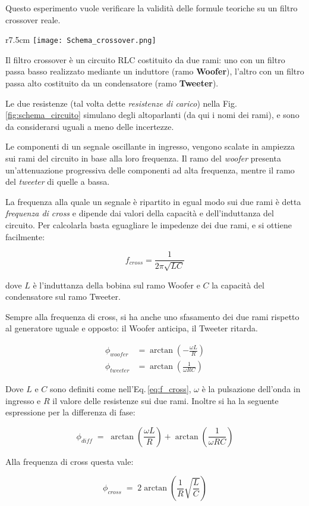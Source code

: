 \documentclass[../Relazione_circuiti]{subfiles}
\begin{document}
Questo esperimento vuole verificare la validità delle formule teoriche su un filtro crossover reale.

\begin{wrapfigure}{r}{7.5cm}
  \centering
  \texttt{[image: Schema\_crossover.png]}
  \caption{Schema del circuito realizzato}
  \label{fig:schema_circuito}
\end{wrapfigure}

Il filtro crossover è un circuito RLC costituito da due rami: uno con un filtro passa basso realizzato mediante un
induttore (ramo \textbf{Woofer}), l'altro con un filtro passa alto costituito da un condensatore (ramo
\textbf{Tweeter}).

Le due resistenze (tal volta dette \textit{resistenze di carico}) nella Fig.\,\ref{fig:schema_circuito} simulano degli
altoparlanti (da qui i nomi dei rami), e sono da considerarsi uguali a meno delle incertezze.

Le componenti di un segnale oscillante in ingresso, vengono scalate in ampiezza sui rami del circuito in base alla loro
frequenza.
Il ramo del \textit{woofer} presenta un'attenuazione progressiva delle componenti ad alta frequenza, mentre il ramo
del \textit{tweeter} di quelle a bassa.

La frequenza alla quale un segnale è ripartito in egual modo sui due rami è detta \textit{frequenza di cross} e dipende
dai valori della capacità e dell'induttanza del circuito.
Per calcolarla basta eguagliare le impedenze dei due rami, e si ottiene facilmente:

\begin{equation}
  \label{eq:f_cross}
  f_{cross} = \frac{1}{2 \pi \sqrt{LC} }
\end{equation}

dove $L$ è l'induttanza della bobina sul ramo Woofer e $C$ la capacità del condensatore sul ramo Tweeter.

Sempre alla frequenza di cross, si ha anche uno sfasamento dei due rami rispetto al generatore uguale e opposto: il
Woofer anticipa, il Tweeter ritarda.

\begin{align}
  \phi_{woofer} &= \arctan(-\frac{\omega L}{R}) \label{eq:p_woofer} \\
  \phi_{tweeter} &= \arctan(\frac{1}{\omega RC}) \label{eq:p_tweeter}
\end{align}

Dove $L$ e $C$ sono definiti come nell'Eq.\,\eqref{eq:f_cross}, $\omega$ è la pulsazione dell'onda in ingresso e $R$ il
valore delle resistenze sui due rami.
Inoltre si ha la seguente espressione per la differenza di fase:

\begin{equation}
  \label{eq:p_diff}
  \phi_{diff} \; = \; \arctan(\frac{\omega L}{R}) + \arctan(\frac{1}{\omega RC})
\end{equation}

Alla frequenza di cross questa vale:

\begin{equation}
  \label{eq:p_diff_cross}
  \phi_{cross} \; = \; 2 \arctan(\frac{1}{R} \sqrt{\frac{L}{C}})
\end{equation}
\end{document}
